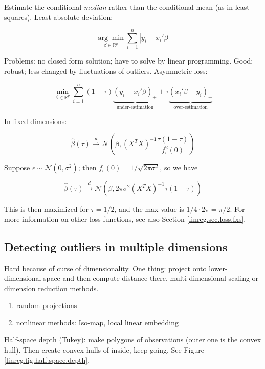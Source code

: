 Estimate the conditional \textit{median} rather than the conditional mean (as in least squares). Least absolute deviation:

\[
\underset{\beta \in \mathbb{R}^{p}}{\arg \min} \sum_{i=1}^n \left| y_i - x_i' \beta \right| 
\]

Problems: no closed form solution; have to solve by linear programming. Good: robust; less changed by fluctuations of outliers. Asymmetric loss:

\[
\underset{\beta \in \mathbb{R}^p}{\min} \sum_{i=1}^n (1 - \tau)  \underbrace{(y_i - x_i' \beta)_+}_{\text{under-estimation}} + \tau \underbrace{ (x_i' \beta - y_i)_+}_{\text{over-estimation}} 
\]

In fixed dimensions: 

\[
\hat{\beta}(\tau) \xrightarrow{d} \mathcal{N} \left(\beta, (X^TX)^{-1} \frac{ \tau(1-\tau)}{ f_\epsilon^2(0)} \right)
\]

Suppose \(\epsilon \sim \mathcal{N}(0,\sigma^2)\); then \(f_\epsilon(0) = 1/ \sqrt{2 \pi \sigma^2}\), so we have 

\[
\hat{\beta}(\tau) \xrightarrow{d} \mathcal{N} \left(\beta, 2 \pi \sigma^2(X^TX)^{-1}  \tau(1 - \tau)  \right)
\]

This is then maximized for \(\tau = 1/2\), and the max value is \(1/4 \cdot 2 \pi = \pi/2\). For more information on other loss functions, see also Section \ref{linreg.sec.loss.fxs}.

\subsection{Detecting outliers in multiple dimensions}

Hard because of curse of dimensionality. One thing: project onto lower-dimensional space and then compute distance there. multi-dimensional scaling or dimension reduction methods.

\begin{enumerate}

\item random projections



\item nonlinear methods: Iso-map, local linear embedding

\end{enumerate}

Half-space depth (Tukey): make polygons of observations (outer one is the convex hull). Then create convex hulls of inside, keep going. See Figure \ref{linreg.fig.half.space.depth}.

